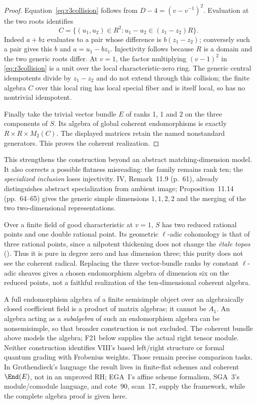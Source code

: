 \documentclass[11pt,a4paper]{article}
\newcommand{\fid}[1]{\textsf{#1}}\newcommand{\gate}[1]{\textsf{#1}}
\theoremstyle{named}\newtheorem{finding}{Finding}[section]
\theoremstyle{definition}\newtheorem{definition}[finding]{Definition}
\theoremstyle{remark}\newtheorem{remark}[finding]{Remark}
\begin{document}
\begin{proof}
Equation~\eqref{eq:r3collision} follows from $D-4=(v-v^{-1})^2$. Evaluation at the two roots identifies
\[
 C=\{(u_1,u_2)\in R^2:u_1-u_2\in(z_1-z_2)R\}.
\]
Indeed $a+bz$ evaluates to a pair whose difference is $b(z_1-z_2)$; conversely such a pair gives this $b$ and $a=u_1-bz_1$. Injectivity follows because $R$ is a domain and the two generic roots differ. At $v=1$, the factor multiplying $(v-1)^2$ in \eqref{eq:r3collision} is a unit over the local characteristic-zero ring. The generic central idempotents divide by $z_1-z_2$ and do not extend through this collision; the finite algebra $C$ over this local ring has local special fiber and is itself local, so has no nontrivial idempotent.

Finally take the trivial vector bundle $E$ of ranks 1, 1 and 2 on the three components of $S$. Its algebra of global coherent endomorphisms is exactly $R\times R\times M_2(C)$. The displayed matrices retain the named nonstandard generators. This proves the coherent realization.
\end{proof}
This strengthens the construction beyond an abstract matching-dimension model. It also corrects a possible flatness misreading: the family remains rank ten; the \emph{specialized inclusion} loses injectivity. IV, Remark~11.9 (p.~61), already distinguishes abstract specialization from ambient image; Proposition~11.14 (pp.~64--65) gives the generic simple dimensions $1,1,2,2$ and the merging of the two two-dimensional representations.

Over a finite field of good characteristic at $v=1$, $S$ has two reduced rational points and one double rational point. Its geometric \(\ell\)-adic cohomology is that of three rational points, since a nilpotent thickening does not change the \emph{\'etale topos} (\cite[Proposition~59.45.4, tag~03SI]{StacksNil}). Thus it is pure in degree zero and has dimension three; this purity does not see the coherent radical. Replacing the three vector-bundle ranks by constant \(\ell\)-adic sheaves gives a chosen endomorphism algebra of dimension six on the reduced points, not a faithful realization of the ten-dimensional coherent algebra.

A full endomorphism algebra of a finite semisimple object over an algebraically closed coefficient field is a product of matrix algebras; it cannot be $A_1$. An algebra acting as a \emph{subalgebra} of such an endomorphism algebra can be nonsemisimple, so that broader construction is not excluded. The coherent bundle above models the algebra; \fid{F21} below supplies the actual right tensor module. Neither construction identifies VIII's based left/right structure or formal quantum grading with Frobenius weights. Those remain precise comparison tasks. In Grothendieck's language the result lives in finite-flat schemes and coherent $\End(E)$, not in an unproved RH; EGA~I's affine scheme formalism, SGA~3's module/comodule language, and cote~90, scan~17, supply the framework, while the complete algebra proof is given here.
\end{document}
